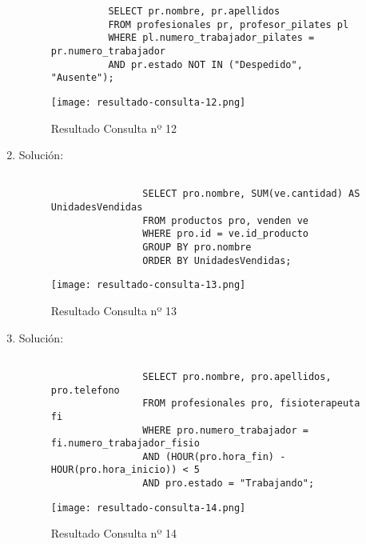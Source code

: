 \begin{enumerate}
\begin{figure}[H]
\begin{tcolorbox}[sharp corners, colback=yellow!30, colframe=white!20]
\begin{verbatim}
          SELECT pr.nombre, pr.apellidos
          FROM profesionales pr, profesor_pilates pl
          WHERE pl.numero_trabajador_pilates = pr.numero_trabajador
          AND pr.estado NOT IN ("Despedido", "Ausente");
            \end{verbatim}
        \end{tcolorbox}
    \end{figure}

    \begin{figure}[H]
        \centering
        \texttt{[image: resultado-consulta-12.png]}
        \caption{Resultado Consulta nº 12}
    \end{figure}

    \item Solución:

    \begin{figure}[H]
        \begin{tcolorbox}[sharp corners, colback=yellow!30, colframe=white!20]
            \scriptsize
            \begin{verbatim}

                SELECT pro.nombre, SUM(ve.cantidad) AS UnidadesVendidas
                FROM productos pro, venden ve
                WHERE pro.id = ve.id_producto
                GROUP BY pro.nombre
                ORDER BY UnidadesVendidas;
            \end{verbatim}
        \end{tcolorbox}
    \end{figure}

    \begin{figure}[H]
        \centering
        \texttt{[image: resultado-consulta-13.png]}
        \caption{Resultado Consulta nº 13}
    \end{figure}

    \item Solución:

    \begin{figure}[H]
        \begin{tcolorbox}[sharp corners, colback=yellow!30, colframe=white!20]
            \scriptsize
            \begin{verbatim}

                SELECT pro.nombre, pro.apellidos, pro.telefono
                FROM profesionales pro, fisioterapeuta fi
                WHERE pro.numero_trabajador = fi.numero_trabajador_fisio
                AND (HOUR(pro.hora_fin) - HOUR(pro.hora_inicio)) < 5
                AND pro.estado = "Trabajando";
            \end{verbatim}
        \end{tcolorbox}
    \end{figure}

    \begin{figure}[H]
        \centering
        \texttt{[image: resultado-consulta-14.png]}
        \caption{Resultado Consulta nº 14}
    \end{figure}
\end{enumerate}



%
%

